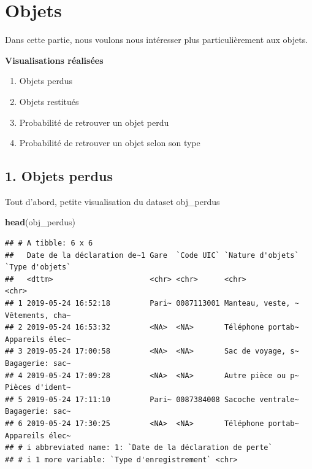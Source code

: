 \documentclass[
]{article}
\newenvironment{Shaded}{\begin{snugshade}}{\end{snugshade}}
\newcommand{\FunctionTok}[1]{\textcolor[rgb]{0.13,0.29,0.53}{\textbf{#1}}}
\newcommand{\NormalTok}[1]{#1}
\begin{document}
\hypertarget{objets}{%
\section{Objets}\label{objets}}

Dans cette partie, nous voulons nous intéresser plus particulièrement
aux objets.

\textbf{Visualisations réalisées}

\begin{enumerate}
\def\labelenumi{\arabic{enumi}.}
\item
  Objets perdus
\item
  Objets restitués
\item
  Probabilité de retrouver un objet perdu
\item
  Probabilité de retrouver un objet selon son type
\end{enumerate}

\hypertarget{objets-perdus}{%
\subsection{1. Objets perdus}\label{objets-perdus}}

Tout d'abord, petite visualisation du dataset obj\_perdus

\begin{Shaded}
\begin{Highlighting}[]
\FunctionTok{head}\NormalTok{(obj\_perdus)}
\end{Highlighting}
\end{Shaded}

\begin{verbatim}
## # A tibble: 6 x 6
##   Date de la déclaration de~1 Gare  `Code UIC` `Nature d'objets` `Type d'objets`
##   <dttm>                      <chr> <chr>      <chr>             <chr>          
## 1 2019-05-24 16:52:18         Pari~ 0087113001 Manteau, veste, ~ Vêtements, cha~
## 2 2019-05-24 16:53:32         <NA>  <NA>       Téléphone portab~ Appareils élec~
## 3 2019-05-24 17:00:58         <NA>  <NA>       Sac de voyage, s~ Bagagerie: sac~
## 4 2019-05-24 17:09:28         <NA>  <NA>       Autre pièce ou p~ Pièces d'ident~
## 5 2019-05-24 17:11:10         Pari~ 0087384008 Sacoche ventrale~ Bagagerie: sac~
## 6 2019-05-24 17:30:25         <NA>  <NA>       Téléphone portab~ Appareils élec~
## # i abbreviated name: 1: `Date de la déclaration de perte`
## # i 1 more variable: `Type d'enregistrement` <chr>
\end{verbatim}
\end{document}
